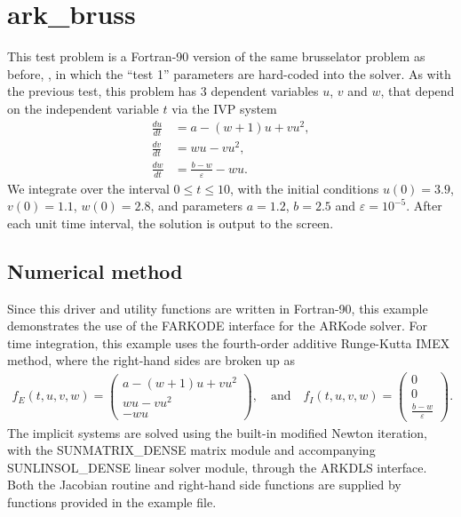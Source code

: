 \documentclass[letterpaper,10pt,english]{sphinxmanual}
\begin{document}
\section{ark\_bruss}
\label{\detokenize{f90_serial:ark-bruss}}\label{\detokenize{f90_serial:id1}}
This test problem is a Fortran-90 version of the same brusselator
problem as before, {\hyperref[\detokenize{c_serial:ark-brusselator}]{}}, in which the “test 1”
parameters are hard-coded into the solver.  As with the previous test,
this problem has 3 dependent variables \(u\), \(v\) and
\(w\), that depend on the independent variable \(t\) via the
IVP system
\begin{equation*}
\begin{split}\frac{du}{dt} &= a - (w+1)u + v u^2, \\
\frac{dv}{dt} &= w u - v u^2, \\
\frac{dw}{dt} &= \frac{b-w}{\varepsilon} - w u.\end{split}
\end{equation*}
We integrate over the interval \(0 \le t \le 10\), with the
initial conditions \(u(0) = 3.9\), \(v(0) = 1.1\),
\(w(0) = 2.8\), and parameters \(a=1.2\), \(b=2.5\) and
\(\varepsilon=10^{-5}\).  After each unit time interval, the
solution is output to the screen.


\subsection{Numerical method}
\label{\detokenize{f90_serial:numerical-method}}
Since this driver and utility functions are written in Fortran-90,
this example demonstrates the use of the FARKODE interface for the
ARKode solver.  For time integration, this example uses the
fourth-order additive Runge-Kutta IMEX method, where the right-hand
sides are broken up as
\begin{equation*}
\begin{split}f_E(t,u,v,w) = \left(\begin{array}{c} a - (w+1)u + v u^2 \\
  w u - v u^2 \\ - w u  \end{array}\right), \quad\text{and}\quad
f_I(t,u,v,w) = \left(\begin{array}{c} 0\\0\\
  \frac{b-w}{\varepsilon}\end{array}\right).\end{split}
\end{equation*}
The implicit systems are solved using the built-in modified Newton
iteration, with the SUNMATRIX\_DENSE matrix module and accompanying
SUNLINSOL\_DENSE linear solver module, through the ARKDLS interface.
Both the Jacobian routine and right-hand side functions are supplied
by functions provided in the example file.
\end{document}
